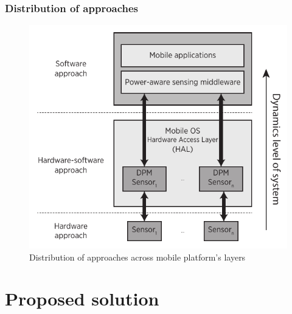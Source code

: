 \documentclass[compress,9pt,xcolor={dvipsnames,table}]{beamer}
\begin{document}
\begin{frame}\frametitle{Distribution of approaches}
\begin{figure}[tb]
  \centering
  \includegraphics[scale=0.72]{../../../resources/images/vectors/approaches-distribution}
  \caption{Distribution of approaches across mobile platform's layers}
  \label{fig:distribution}
\end{figure}
\end{frame}


\section{Proposed solution}
\end{document}
